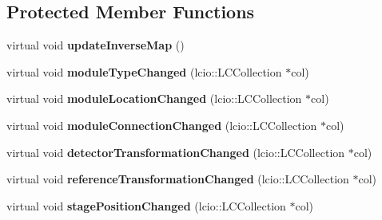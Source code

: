 \subsection*{Protected Member Functions}
\begin{DoxyCompactItemize}
\item 
virtual void {\bfseries update\-Inverse\-Map} ()\label{classCALICE_1_1fastMappingIIProcessor_ac8554c8b7fe9ed1e0ca25a08eeb8f527}

\item 
virtual void {\bfseries module\-Type\-Changed} (lcio\-::\-L\-C\-Collection $\ast$col)\label{classCALICE_1_1fastMappingIIProcessor_a28c17f0864be618ad5168c9849f1ea01}

\item 
virtual void {\bfseries module\-Location\-Changed} (lcio\-::\-L\-C\-Collection $\ast$col)\label{classCALICE_1_1fastMappingIIProcessor_aaa57f57f89b2b16635dba790b60c212c}

\item 
virtual void {\bfseries module\-Connection\-Changed} (lcio\-::\-L\-C\-Collection $\ast$col)\label{classCALICE_1_1fastMappingIIProcessor_a06bf0a87fa87dd8ed6bd979b8fbeb86b}

\item 
virtual void {\bfseries detector\-Transformation\-Changed} (lcio\-::\-L\-C\-Collection $\ast$col)\label{classCALICE_1_1fastMappingIIProcessor_a40c88849c1b343429941a7b64553aa63}

\item 
virtual void {\bfseries reference\-Transformation\-Changed} (lcio\-::\-L\-C\-Collection $\ast$col)\label{classCALICE_1_1fastMappingIIProcessor_a13db4be9a8c31bb01a20915394007d12}

\item 
virtual void {\bfseries stage\-Position\-Changed} (lcio\-::\-L\-C\-Collection $\ast$col)\label{classCALICE_1_1fastMappingIIProcessor_af962a3c913e7154e79d52ca661526e38}

\end{DoxyCompactItemize}

